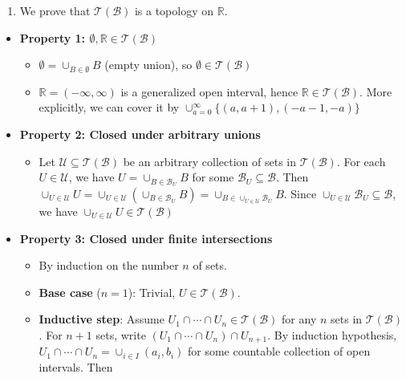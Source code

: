 \begin{mystsolution}\begin{enumerate}
\item We prove that $\mathcal{T}(\mathcal{B})$ is a topology on $\mathbb{R}$.
\end{enumerate}

\begin{itemize}
\item \textbf{Property 1: $\emptyset, \mathbb{R} \in \mathcal{T}(\mathcal{B})$}

\begin{itemize}
\item $\emptyset = \cup_{B \in \emptyset} B$ (empty union), so $\emptyset \in \mathcal{T}(\mathcal{B})$
\item $\mathbb{R} = ( -\infty, \infty)$ is a generalized open interval, hence $\mathbb{R} \in \mathcal{T}(\mathcal{B})$. More explicitly, we can cover it by $\cup_{a=0}^{\infty} \{(a,a+1),( -a -1, -a)\}$
\end{itemize}


\item \textbf{Property 2: Closed under arbitrary unions}

\begin{itemize}
\item Let $\mathcal{U} \subseteq \mathcal{T}(\mathcal{B})$ be an arbitrary collection of sets in $\mathcal{T}(\mathcal{B})$. For each $U \in \mathcal{U}$, we have $U = \cup_{B \in \mathcal{B}_U} B$ for some $\mathcal{B}_U \subseteq \mathcal{B}$. Then $\cup_{U \in \mathcal{U}} U = \cup_{U \in \mathcal{U}} \left(\cup_{B \in \mathcal{B}_U} B\right) = \cup_{B \in \cup_{U \in \mathcal{U}} \mathcal{B}_U} B$. Since $\cup_{U \in \mathcal{U}} \mathcal{B}_U \subseteq \mathcal{B}$, we have $\cup_{U \in \mathcal{U}} U \in \mathcal{T}(\mathcal{B})$
\end{itemize}


\item \textbf{Property 3: Closed under finite intersections}

\begin{itemize}
\item By induction on the number $n$ of sets.
\item \textbf{Base case} ($n=1$): Trivial, $U \in \mathcal{T}(\mathcal{B})$.
\item \textbf{Inductive step}: Assume $U_1 \cap \cdots \cap U_n \in \mathcal{T}(\mathcal{B})$ for any $n$ sets in $\mathcal{T}(\mathcal{B})$.
For $n+1$ sets, write $(U_1 \cap \cdots \cap U_n) \cap U_{n+1}$. By induction hypothesis, $U_1 \cap \cdots \cap U_n = \cup_{i \in I}(a_i, b_i)$
for some countable collection of open intervals. Then


\end{itemize}
\end{itemize}
\end{mystsolution}

